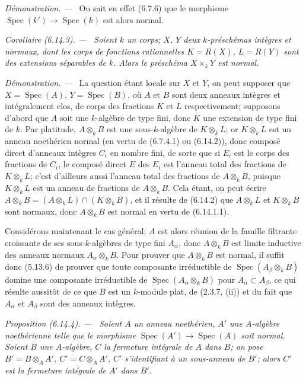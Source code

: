 \documentclass[10pt,oneside]{book}
\makeatletter
\newcommand{\oldpage}[2][]{%
  \setcounter{footnote}{0}%
  \marginpar{\scriptsize\textbf{#1}~|~#2}\ignorespaces}
\newenvironment{proposition}[1][]{%
  \par\medskip\noindent\itshape Proposition (#1). ---\ }{\par}
\newenvironment{corollary}[1][]{%
  \par\medskip\noindent\itshape Corollaire (#1). ---\ }{\par}
\newenvironment{proof}{%
  \par\medskip\noindent\textit{Démonstration. ---\ }}{\par}
\newcommand{\EGAReaderTarget}[2]{\hypertarget{#1}{}\@bsphack\begingroup\def\@currentHref{#1}\label{#2}\endgroup\@esphack}
\makeatother
\begin{document}
\begin{proof}
On sait en effet (6.7.6) que le morphisme
$\operatorname{Spec}(k')\to\operatorname{Spec}(k)$ est alors normal.
\end{proof}

\begin{corollary}[6.14.3]
\label{IV.2.s6.14.3-fr}
Soient $k$ un corps; $X$, $Y$ deux $k$-préschémas intègres et normaux, dont
les corps de fonctions rationnelles $K=R(X)$, $L=R(Y)$ sont des extensions
séparables de $k$. Alors le préschéma $X\times_k Y$ est normal.
\end{corollary}

\begin{proof}
\oldpage[IV-2]{174}
La question étant locale sur $X$ et $Y$, on peut supposer que
$X=\operatorname{Spec}(A)$, $Y=\operatorname{Spec}(B)$, où $A$ et $B$ sont
deux anneaux intègres et intégralement clos, de corps des fractions $K$ et
$L$ respectivement; supposons d'abord que $A$ soit une $k$-algèbre de type
fini, donc $K$ une extension de type fini de $k$. Par platitude,
$A\otimes_k B$ est une sous-$k$-algèbre de $K\otimes_k L$; or
$K\otimes_k L$ est un anneau noethérien normal (en vertu de (6.7.4.1) ou
(6.14.2)), donc composé direct d'anneaux intègres $C_i$ en nombre fini, de
sorte que si $E_i$ est le corps des fractions de $C_i$, le composé direct
$E$ des $E_i$ est l'anneau total des fractions de $K\otimes_k L$; c'est
d'ailleurs aussi l'anneau total des fractions de $A\otimes_k B$, puisque
$K\otimes_k L$ est un anneau de fractions de $A\otimes_k B$. Cela étant,
on peut écrire
$A\otimes_k B=(A\otimes_k L)\cap(K\otimes_k B)$, et il résulte de (6.14.2)
que $A\otimes_k L$ et $K\otimes_k B$ sont normaux, donc $A\otimes_k B$ est
normal en vertu de (6.14.1.1).

Considérons maintenant le cas général; $A$ est alors réunion de la famille
filtrante croissante de ses sous-$k$-algèbres de type fini $A_\alpha$,
donc $A\otimes_k B$ est limite inductive des anneaux normaux
$A_\alpha\otimes_k B$. Pour prouver que $A\otimes_k B$ est normal, il
suffit donc (5.13.6) de prouver que toute composante irréductible de
$\operatorname{Spec}(A_\beta\otimes_k B)$ domine une composante
irréductible de $\operatorname{Spec}(A_\alpha\otimes_k B)$ pour
$A_\alpha\subset A_\beta$, ce qui résulte aussitôt de ce que $B$ est un
$k$-module plat, de (2.3.7, (ii)) et du fait que $A_\alpha$ et $A_\beta$
sont des anneaux intègres.
\end{proof}

\begin{proposition}[6.14.4]
\EGAReaderTarget{ega4.c04.prop.6-14-4}{IV.2.s6.14.4-fr}
Soient $A$ un anneau noethérien, $A'$ une $A$-algèbre noethérienne telle
que le morphisme $\operatorname{Spec}(A')\to\operatorname{Spec}(A)$ soit
normal. Soient $B$ une $A$-algèbre, $C$ la fermeture intégrale de $A$ dans
$B$; on pose $B'=B\otimes_A A'$, $C'=C\otimes_A A'$, $C'$ s'identifiant à
un sous-anneau de $B'$; alors $C'$ est la fermeture intégrale de $A'$ dans
$B'$.
\end{proposition}
\end{document}
